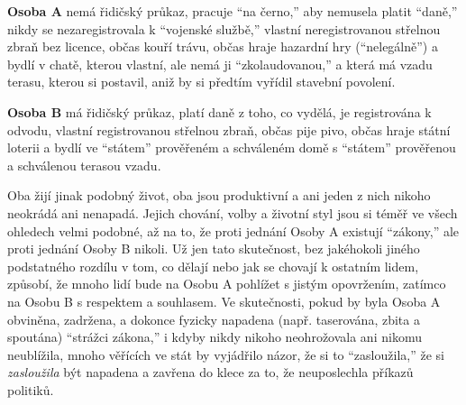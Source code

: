 \documentclass{book}
\begin{document}
\textbf{Osoba A} nemá řidičský průkaz, pracuje \enquote{na černo,} aby nemusela platit \enquote{daně,} nikdy se nezaregistrovala k \enquote{vojenské službě,} vlastní neregistrovanou střelnou zbraň bez licence, občas kouří trávu, občas hraje hazardní hry (\enquote{nelegálně}) a bydlí v chatě, kterou vlastní, ale nemá ji \enquote{zkolaudovanou,} a která má vzadu terasu, kterou si postavil, aniž by si předtím vyřídil stavební povolení.

\textbf{Osoba B} má řidičský průkaz, platí daně z toho, co vydělá, je registrována k odvodu, vlastní registrovanou střelnou zbraň, občas pije pivo, občas hraje státní loterii a bydlí ve \enquote{státem} prověřeném a schváleném domě s \enquote{státem} prověřenou a schválenou terasou vzadu.

Oba žijí jinak podobný život, oba jsou produktivní a ani jeden z nich nikoho neokrádá ani nenapadá. Jejich chování, volby a životní styl jsou si téměř ve všech ohledech velmi podobné, až na to, že proti jednání Osoby A existují \enquote{zákony,} ale proti jednání Osoby B nikoli. Už jen tato skutečnost, bez jakéhokoli jiného podstatného rozdílu v tom, co dělají nebo jak se chovají k ostatním lidem, způsobí, že mnoho lidí bude na Osobu A pohlížet s jistým opovržením, zatímco na Osobu B s respektem a souhlasem. Ve skutečnosti, pokud by byla Osoba A obviněna, zadržena, a dokonce fyzicky napadena (např. taserována, zbita a spoutána) \enquote{strážci zákona,} i kdyby nikdy nikoho neohrožovala ani nikomu neublížila, mnoho věřících ve stát by vyjádřilo názor, že si to \enquote{zasloužila,} že si \emph{zasloužila} být napadena a zavřena do klece za to, že neuposlechla příkazů politiků.
\end{document}
